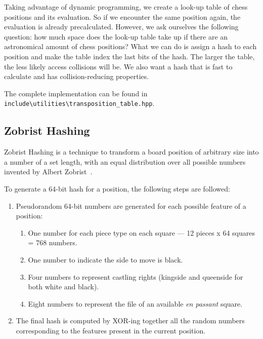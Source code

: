 \vspace{1em}

\noindent Taking advantage of dynamic programming, we create a look-up table of chess positions and its evaluation. So if we encounter the same position again, the evaluation is already precalculated. However, we ask ourselves the following question: how much space does the look-up table take up if there are an astronomical amount of chess positions? What we can do is assign a hash to each position and make the table index the last bits of the hash. The larger the table, the less likely access collisions will be. We also want a hash that is fast to calculate and has collision-reducing properties.
~\cite{TranspositionTable}

\vspace{1em}

\noindent \parbox{\textwidth}{The complete implementation can be found in\\\texttt{include\textbackslash{}utilities\textbackslash{}transposition\_table.hpp}.}

\subsection{Zobrist Hashing}

Zobrist Hashing is a technique to transform a board position of arbitrary size into a number of a set length, with an equal distribution over all possible numbers invented by Albert Zobrist~\cite{ZobristHashing}.

\vspace{1em}

\noindent To generate a 64-bit hash for a position, the following steps are followed:

\begin{enumerate}
  \item Pseudorandom 64-bit numbers are generated for each possible feature of a position:
  \begin{enumerate}
    \item One number for each piece type on each square — 12 pieces x 64 squares = 768 numbers.
    \item One number to indicate the side to move is black.
    \item Four numbers to represent castling rights (kingside and queenside for both white and black).
    \item Eight numbers to represent the file of an available \textit{en passant} square.
  \end{enumerate}
  \item The final hash is computed by XOR-ing together all the random numbers corresponding to the features present in the current position.
\end{enumerate}


